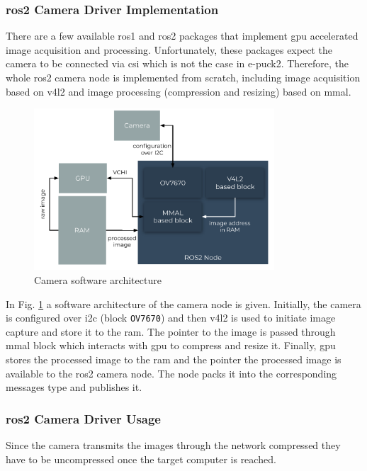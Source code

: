 \subsubsection{\ac{ros2} Camera Driver Implementation}
There are a few available \ac{ros}1 and \ac{ros2} packages that implement \ac{gpu} accelerated image acquisition and processing. Unfortunately, these packages expect the camera to be connected via \ac{csi} which is not the case in e-puck2. Therefore, the whole \ac{ros2} camera node is implemented from scratch, including image acquisition based on \ac{v4l2} and image processing (compression and resizing) based on \ac{mmal}.
 
 \begin{figure}[H]
    \centering
    \includegraphics[width=0.8\textwidth]{physical/figures/camera_software_architecture.pdf}
    \caption{Camera software architecture}
    \label{fig:physical:camera_software_architecture}
\end{figure}
 
 In Fig. \ref{fig:physical:camera_software_architecture} a software architecture of the camera node is given. Initially, the camera is configured over \ac{i2c} (block \texttt{OV7670}) and then \ac{v4l2}  is used to initiate image capture and store it to the \ac{ram}. The pointer to the image is passed through \ac{mmal} block which interacts with \ac{gpu} to compress and resize it. Finally, \ac{gpu} stores the processed image to the \ac{ram} and the pointer the processed image is available to the \ac{ros2} camera node. The node packs it into the corresponding messages type and publishes it.
 
 \subsubsection{\ac{ros2} Camera Driver Usage}
 Since the camera transmits the images through the network compressed they have to be uncompressed once the target computer is reached.
 
